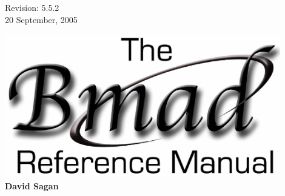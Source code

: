 \thispagestyle{empty}

\begin{flushright}
\large
  Revision: 5.5.2 \\
  20 September, 2005 \\
\end{flushright}

\vfill

{
\begin{center}
\includegraphics[width=12cm]{bmad_ref_manual.eps} \\
\vskip 0.3in
\huge\bf David Sagan
\end{center}
}

\vfill
\break